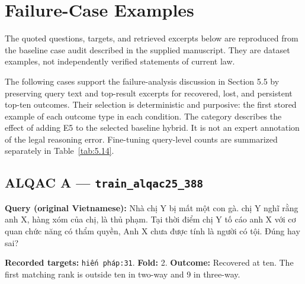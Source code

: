 \chapter{Failure-Case Examples}

The quoted questions, targets, and retrieved excerpts below are reproduced from the baseline case audit described in the supplied manuscript. They are dataset examples, not independently verified statements of current law.

The following cases support the failure-analysis discussion in Section 5.5 by preserving query text and top-result excerpts for recovered, lost, and persistent top-ten outcomes. Their selection is deterministic and purposive: the first stored example of each outcome type in each condition. The category describes the effect of adding E5 to the selected baseline hybrid. It is not an expert annotation of the legal reasoning error. Fine-tuning query-level counts are summarized separately in Table~\ref{tab:5.14}.

\section{ALQAC A — \texttt{train\_al\allowbreak{}qac25\_38\allowbreak{}8}}

\textbf{Query (original Vietnamese):} Nhà chị Y bị mất một con gà. chị Y nghĩ rằng anh X, hàng xóm của chị, là thủ phạm. Tại thời điểm chị Y tố cáo anh X với cơ quan chức năng có thẩm quyền, Anh X chưa được tính là người có tội. Đúng hay sai?

\textbf{Recorded targets:} \texttt{hiến phá\allowbreak{}p:31}. \textbf{Fold:} 2. \textbf{Outcome:} Recovered at ten. The first matching rank is outside ten in two-way and 9 in three-way.

